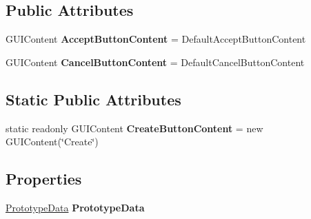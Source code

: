 \subsection*{Public Attributes}
\begin{DoxyCompactItemize}
\item 
\hypertarget{class_hattori_game2_1_1_prototyping_1_1_editor_1_1_prototype_details_window_ab82d7cfe2f7ea9fee0691e3351976220}{}G\+U\+I\+Content {\bfseries Accept\+Button\+Content} = Default\+Accept\+Button\+Content\label{class_hattori_game2_1_1_prototyping_1_1_editor_1_1_prototype_details_window_ab82d7cfe2f7ea9fee0691e3351976220}

\item 
\hypertarget{class_hattori_game2_1_1_prototyping_1_1_editor_1_1_prototype_details_window_ae917a378f672dc63beba0ccc91f88e79}{}G\+U\+I\+Content {\bfseries Cancel\+Button\+Content} = Default\+Cancel\+Button\+Content\label{class_hattori_game2_1_1_prototyping_1_1_editor_1_1_prototype_details_window_ae917a378f672dc63beba0ccc91f88e79}

\end{DoxyCompactItemize}
\subsection*{Static Public Attributes}
\begin{DoxyCompactItemize}
\item 
\hypertarget{class_hattori_game2_1_1_prototyping_1_1_editor_1_1_prototype_details_window_afb4ce8e867372190f85ec74f9a6bcea8}{}static readonly G\+U\+I\+Content {\bfseries Create\+Button\+Content} = new G\+U\+I\+Content(\char`\"{}Create\char`\"{})\label{class_hattori_game2_1_1_prototyping_1_1_editor_1_1_prototype_details_window_afb4ce8e867372190f85ec74f9a6bcea8}

\end{DoxyCompactItemize}
\subsection*{Properties}
\begin{DoxyCompactItemize}
\item 
\hypertarget{class_hattori_game2_1_1_prototyping_1_1_editor_1_1_prototype_details_window_a4aa1449ce3ec3a5de41d23eda19d67b6}{}\hyperlink{class_hattori_game2_1_1_prototyping_1_1_prototype_data}{Prototype\+Data} {\bfseries Prototype\+Data}\label{class_hattori_game2_1_1_prototyping_1_1_editor_1_1_prototype_details_window_a4aa1449ce3ec3a5de41d23eda19d67b6}

\end{DoxyCompactItemize}
